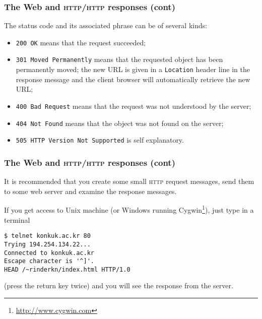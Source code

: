 %
\begin{frame}[containsverbatim]
\frametitle{The Web and \textsc{http}/\textsc{http} responses (cont)}

The status code and its associated phrase can be of several kinds:
\begin{itemize}

  \item \verb+200 OK+ means that the request succeeded;

  \item \verb+301 Moved Permanently+ means that the requested object
  has been permanently moved; the new URL is given in a
  \verb+Location+ header line in the response message and the client
  browser will automatically retrieve the new URL;

  \item \verb+400 Bad Request+ means that the request was not
  understood by the server;

  \item \verb+404 Not Found+ means that the object was not found on
  the server;

  \item \verb+505 HTTP Version Not Supported+ is self explanatory.

\end{itemize}

\end{frame}

%
\begin{frame}[containsverbatim]
\frametitle{The Web and \textsc{http}/\textsc{http} responses (cont)}

It is recommended that you create some small \textsc{http} request
messages, send them to some web server and examine the response messages. 

\bigskip

If you get access to Unix machine (or Windows running
\textsf{Cygwin}\footnote{\url{http://www.cygwin.com}}), just type in a
terminal
{\small
\begin{verbatim}
$ telnet konkuk.ac.kr 80
Trying 194.254.134.22...
Connected to konkuk.ac.kr
Escape character is '^]'.
HEAD /~rinderkn/index.html HTTP/1.0
\end{verbatim}
}
(press the return key twice) and you will see the response from the
server.

\end{frame}


